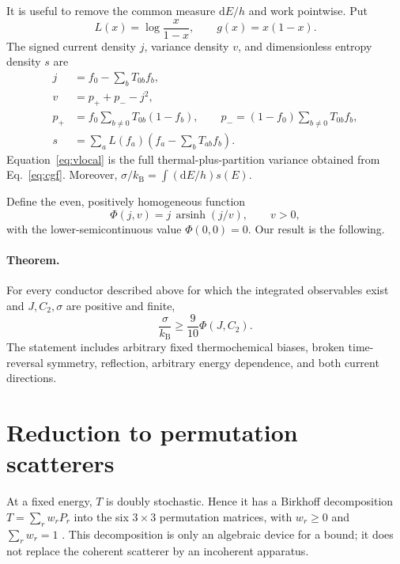 \documentclass[aps,pra,reprint,superscriptaddress,nofootinbib,longbibliography,floatfix]{revtex4-2}
\newcommand{\kb}{k_{\mathrm B}}
\newcommand{\dd}{\mathrm d}
\newcommand{\asinh}{\operatorname{arsinh}}
\newcommand{\PhiF}{\Phi}
\begin{document}
It is useful to remove the common measure $\dd E/h$ and work pointwise.  Put
\begin{equation}
 L(x)=\log\frac{x}{1-x},\qquad g(x)=x(1-x).
\end{equation}
The signed current density $j$, variance density $v$, and dimensionless entropy density $s$ are
\begin{align}
 j&=f_0-\sum_bT_{0b}f_b,\label{eq:jlocal}\\
 v&=p_++p_--j^2,\label{eq:vlocal}\\
 p_+&=f_0\sum_{b\ne0}T_{0b}(1-f_b),\qquad
 p_-=(1-f_0)\sum_{b\ne0}T_{0b}f_b,\label{eq:pmp}\\
 s&=\sum_aL(f_a)\left(f_a-\sum_bT_{ab}f_b\right).
 \label{eq:slocal}
\end{align}
Equation~\eqref{eq:vlocal} is the full thermal-plus-partition variance obtained from Eq.~\eqref{eq:cgf}.  Moreover, $\sigma/\kb=\int(\dd E/h)s(E)$.

Define the even, positively homogeneous function
\begin{equation}
 \PhiF(j,v)=j\,\asinh(j/v),\qquad v>0,
 \label{eq:phi}
\end{equation}
with the lower-semicontinuous value $\PhiF(0,0)=0$.  Our result is the following.

\paragraph*{Theorem.}
For every conductor described above for which the integrated observables exist and $J,C_2,\sigma$ are positive and finite,
\begin{equation}
 \frac{\sigma}{\kb}\geq\frac{9}{10}\PhiF(J,C_2).
 \label{eq:theorem}
\end{equation}
The statement includes arbitrary fixed thermochemical biases, broken time-reversal symmetry, reflection, arbitrary energy dependence, and both current directions.

\section{Reduction to permutation scatterers}
\label{sec:reduction}

At a fixed energy, $T$ is doubly stochastic.  Hence it has a Birkhoff decomposition $T=\sum_r w_rP_r$ into the six $3\times3$ permutation matrices, with $w_r\geq0$ and $\sum_rw_r=1$ \cite{MarshallBook}.  This decomposition is only an algebraic device for a bound; it does not replace the coherent scatterer by an incoherent apparatus.
\end{document}
